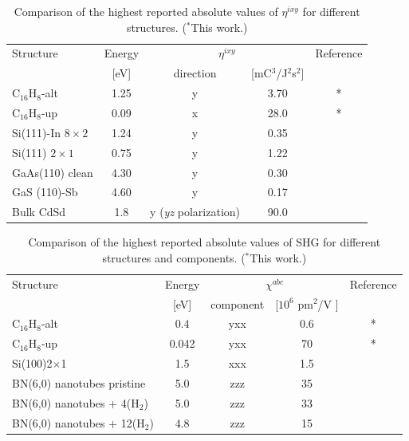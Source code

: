 \documentclass[pss]{wiley2sp} %
\begin{document}
\begin{table}
    \caption{Comparison of the highest reported absolute values of {$\eta^{ixy}$} for 
    different structures. ($^{*}$This work.)}
    \label{tab:etacomp}
    \centering
    \begin{tabular}{lcccc}
    Structure & Energy &  \multicolumn{2}{c}{$\eta^{ixy}$} &  Reference\\
    \cline{3-4}
              & [eV]   & direction & [mC$^{3}$/J$^{2}$s$^{2}$] \\
    \hline
    C$_{16}$H$_{8}$-alt               & 1.25  & y & 3.70  & *     \\
    C$_{16}$H$_{8}$-up                & 0.09  & x & 28.0  & *     \\
    Si(111)-In $8\times2$   & 1.24  & y & 0.35  & \cite{arzate2014optical}  \\
    Si(111) $2\times1$      & 0.75  & y & 1.22  & \cite{mendoza2012optical} \\
    GaAs(110) clean         & 4.30  & y & 0.30  & \cite{nastos2007full}     \\
    GaS (110)-Sb            & 4.60  & y & 0.17  & \cite{cabellos2011optical}\\
    Bulk CdSd               & 1.8   & y {\scriptsize (\emph{yz} polarization)} 
    & 90.0  & \cite{nastos2006optical}  \\
    \end{tabular}
\end{table}


\begin{table}
    \caption{Comparison of the highest reported absolute values of SHG for 
    different structures and components. ($^{*}$This work.)}
    \label{tab:shgcomp}
    \centering
    \begin{tabular}{lcccc}
    Structure & Energy & \multicolumn{2}{c}{$\chi^{abc} $} &  Reference\\
    \cline{3-4}
              & [eV]   & component & [$10^{6} $ pm$^{2}$/V ] \\
    \hline
    C$_{16}$H$_{8}$-alt                       & 0.4   & yxx   & 0.6   & *     \\
    C$_{16}$H$_{8}$-up                        & 0.042 & yxx   & 70    & *     \\
    Si(100)2$\times$1               & 1.5   & xxx   & 1.5   & \cite{anderson2015theory} \ \\
    BN(6,0) nanotubes pristine      & 5.0   & zzz   & 35    & \cite{salazar2014molecular} \\
    BN(6,0) nanotubes + 4(H$_{2}$)  & 5.0   & zzz   & 33    & \cite{salazar2014molecular} \\
    BN(6,0) nanotubes + 12(H$_{2}$) & 4.8   & zzz   & 15    & \cite{salazar2014molecular} \\
    \end{tabular}
\end{table}
\end{document}

